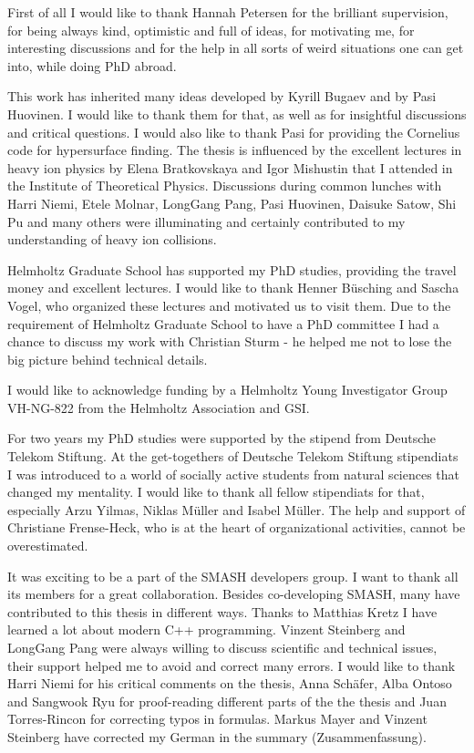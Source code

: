 \begin{acknowledgements}

  First of all I would like to thank Hannah Petersen for the brilliant
supervision, for being always kind, optimistic and full of ideas, for
motivating me, for interesting discussions and for the help in all sorts of
weird situations one can get into, while doing PhD abroad.

This work has inherited many ideas developed by Kyrill Bugaev and by Pasi
Huovinen.  I would like to thank them for that, as well as for insightful
discussions and critical questions. I would also like to thank Pasi for
providing the Cornelius code for hypersurface finding. The thesis is influenced
by the excellent lectures in heavy ion physics by Elena Bratkovskaya and Igor
Mishustin that I attended in the Institute of Theoretical Physics.  Discussions
during common lunches with Harri Niemi, Etele Molnar, LongGang Pang, Pasi
Huovinen, Daisuke Satow, Shi Pu and many others were illuminating and certainly
contributed to my understanding of heavy ion collisions.

Helmholtz Graduate School has supported my PhD studies, providing
the travel money and excellent lectures. I would like to thank Henner B\"usching
and Sascha Vogel, who organized these lectures and motivated us to visit them.
Due to the requirement of Helmholtz Graduate School to have a PhD committee I
had a chance to discuss my work with Christian Sturm - he helped me not to lose
the big picture behind technical details.

I would like to acknowledge funding by a Helmholtz Young Investigator
Group VH-NG-822 from the Helmholtz Association and GSI.

For two years my PhD studies were supported by the stipend from Deutsche Telekom
Stiftung. At the get-togethers of Deutsche Telekom Stiftung stipendiats I was
introduced to a world of socially active students from natural sciences that changed my
mentality. I would like to thank all fellow stipendiats for that, especially Arzu
Yilmas, Niklas M\"uller and Isabel M\"uller.  The help and support of Christiane
Frense-Heck, who is at the heart of organizational activities, cannot be overestimated.

It was exciting to be a part of the SMASH developers group. I want to thank all
its members for a great collaboration. Besides co-developing SMASH, many have
contributed to this thesis in different ways. Thanks to Matthias Kretz I have
learned a lot about modern C++ programming.  Vinzent Steinberg and LongGang Pang
were always willing to discuss scientific and technical issues, their support
helped me to avoid and correct many errors. I would like to thank Harri Niemi for
his critical comments on the thesis, Anna Sch\"afer, Alba Ontoso and Sangwook Ryu for
proof-reading different parts of the the thesis and Juan Torres-Rincon for correcting
typos in formulas. Markus Mayer and Vinzent Steinberg have corrected my German in the
summary (Zusammenfassung).


\end{acknowledgements}
